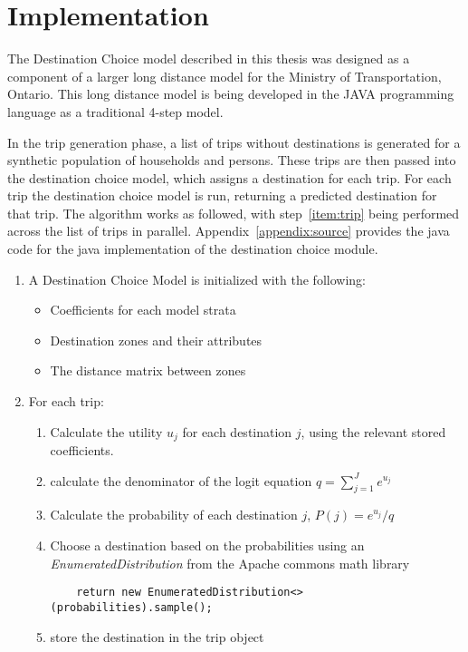 \section{Implementation}
\label{section:implementation}
The Destination Choice model described in this thesis was designed as a component of a larger long distance model for the Ministry of Transportation, Ontario. This long distance model is being developed in the JAVA programming language as a traditional 4-step model. 

In the trip generation phase, a list of trips without destinations is generated for a synthetic population of households and persons. These trips are then passed into the destination choice model, which assigns a destination for each trip. For each trip the destination choice model is run, returning a predicted destination for that trip. The algorithm works as followed, with step~\ref{item:trip} being performed across the list of trips in parallel. Appendix~\ref{appendix:source} provides the java code for the java implementation of the destination choice module. %

\begin{enumerate}
\item A Destination Choice Model is initialized with the following:
	\begin{itemize}
	\item Coefficients for each model strata
	\item Destination zones and their attributes
	\item The distance matrix between zones
	\end{itemize}
\item \label{item:trip} For each trip:
	\begin{enumerate}
	\item Calculate the utility $u_j$ for each destination $j$, using the relevant stored coefficients.
	\item \label{item:denom} calculate the denominator of the logit equation $q = {\sum_{j=1}^{J} e^{u_j}}
	$
	\item Calculate the probability of each destination $j$, $P(j) = e^{u_j} / q $
	\item Choose a destination based on the probabilities using an \textit{EnumeratedDistribution} from the Apache commons math library 
	\begin{verbatim}
	return new EnumeratedDistribution<>(probabilities).sample();
	\end{verbatim}

	\item store the destination in the trip object
	\end{enumerate}
\end{enumerate}

